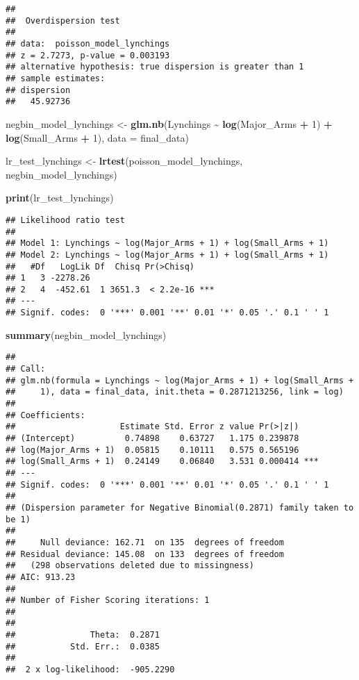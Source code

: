\documentclass[
  11pt,
]{article}
\newenvironment{Shaded}{\begin{snugshade}}{\end{snugshade}}
\newcommand{\AttributeTok}[1]{\textcolor[rgb]{0.13,0.29,0.53}{#1}}
\newcommand{\DecValTok}[1]{\textcolor[rgb]{0.00,0.00,0.81}{#1}}
\newcommand{\FunctionTok}[1]{\textcolor[rgb]{0.13,0.29,0.53}{\textbf{#1}}}
\newcommand{\NormalTok}[1]{#1}
\newcommand{\OtherTok}[1]{\textcolor[rgb]{0.56,0.35,0.01}{#1}}
\newcommand{\SpecialCharTok}[1]{\textcolor[rgb]{0.81,0.36,0.00}{\textbf{#1}}}
\begin{document}
\begin{verbatim}
## 
##  Overdispersion test
## 
## data:  poisson_model_lynchings
## z = 2.7273, p-value = 0.003193
## alternative hypothesis: true dispersion is greater than 1
## sample estimates:
## dispersion 
##   45.92736
\end{verbatim}

\begin{Shaded}
\begin{Highlighting}[]
\NormalTok{negbin\_model\_lynchings }\OtherTok{\textless{}{-}} \FunctionTok{glm.nb}\NormalTok{(Lynchings }\SpecialCharTok{\textasciitilde{}} \FunctionTok{log}\NormalTok{(Major\_Arms }\SpecialCharTok{+} \DecValTok{1}\NormalTok{) }\SpecialCharTok{+} \FunctionTok{log}\NormalTok{(Small\_Arms }\SpecialCharTok{+} \DecValTok{1}\NormalTok{), }\AttributeTok{data =}\NormalTok{ final\_data)}

\NormalTok{lr\_test\_lynchings }\OtherTok{\textless{}{-}} \FunctionTok{lrtest}\NormalTok{(poisson\_model\_lynchings, negbin\_model\_lynchings)}

\FunctionTok{print}\NormalTok{(lr\_test\_lynchings) }
\end{Highlighting}
\end{Shaded}

\begin{verbatim}
## Likelihood ratio test
## 
## Model 1: Lynchings ~ log(Major_Arms + 1) + log(Small_Arms + 1)
## Model 2: Lynchings ~ log(Major_Arms + 1) + log(Small_Arms + 1)
##   #Df   LogLik Df  Chisq Pr(>Chisq)    
## 1   3 -2278.26                         
## 2   4  -452.61  1 3651.3  < 2.2e-16 ***
## ---
## Signif. codes:  0 '***' 0.001 '**' 0.01 '*' 0.05 '.' 0.1 ' ' 1
\end{verbatim}

\begin{Shaded}
\begin{Highlighting}[]
\FunctionTok{summary}\NormalTok{(negbin\_model\_lynchings)}
\end{Highlighting}
\end{Shaded}

\begin{verbatim}
## 
## Call:
## glm.nb(formula = Lynchings ~ log(Major_Arms + 1) + log(Small_Arms + 
##     1), data = final_data, init.theta = 0.2871213256, link = log)
## 
## Coefficients:
##                     Estimate Std. Error z value Pr(>|z|)    
## (Intercept)          0.74898    0.63727   1.175 0.239878    
## log(Major_Arms + 1)  0.05815    0.10111   0.575 0.565196    
## log(Small_Arms + 1)  0.24149    0.06840   3.531 0.000414 ***
## ---
## Signif. codes:  0 '***' 0.001 '**' 0.01 '*' 0.05 '.' 0.1 ' ' 1
## 
## (Dispersion parameter for Negative Binomial(0.2871) family taken to be 1)
## 
##     Null deviance: 162.71  on 135  degrees of freedom
## Residual deviance: 145.08  on 133  degrees of freedom
##   (298 observations deleted due to missingness)
## AIC: 913.23
## 
## Number of Fisher Scoring iterations: 1
## 
## 
##               Theta:  0.2871 
##           Std. Err.:  0.0385 
## 
##  2 x log-likelihood:  -905.2290
\end{verbatim}
\end{document}
